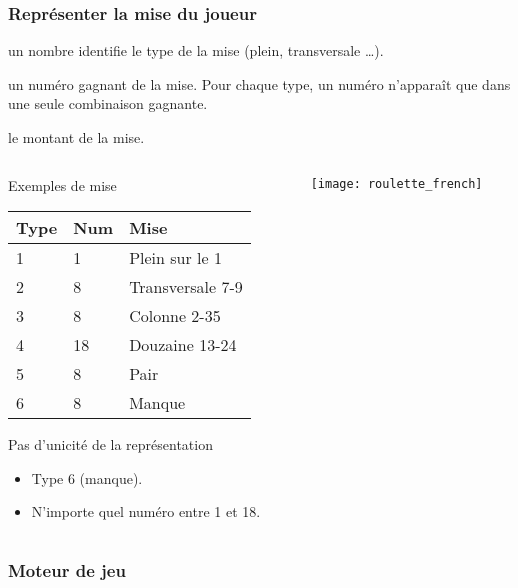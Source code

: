 \documentclass[10pt]{beamer}
\begin{document}
\begin{frame}
  \frametitle{Représenter la mise du joueur}
  \begin{description}[Montant]
  \item[Type] un nombre identifie le type de la mise (plein, transversale \dots).
  \item[Numéro] un numéro gagnant de la mise. Pour chaque type, un numéro n'apparaît que dans une seule combinaison gagnante.
  \item[Montant] le montant de la mise.
  \end{description}
  
\begin{columns}[c]
\begin{column}{0.58\textwidth}
  \begin{exampleblock}{Exemples de mise}
  \end{exampleblock}
  \begin{tabular}{lll}
    \toprule
    Type & Num & Mise             \\
    \midrule
    1    & 1   & Plein sur le 1   \\
    2    & 8   & Transversale 7-9 \\
    3    & 8   & Colonne 2-35     \\
    4    & 18  & Douzaine 13-24   \\
    5    & 8   & Pair             \\
    6    & 8   & Manque           \\
    \bottomrule
  \end{tabular}
  \begin{alertblock}{Pas d'unicité de la représentation}
    \begin{itemize}
    \item Type 6 (manque).
    \item N'importe quel numéro entre 1 et 18.
    \end{itemize}
  \end{alertblock}
  \end{column}
\begin{column}{0.42\textwidth}
    \texttt{[image: roulette\_french]}
  \end{column}
\end{columns}

\end{frame}


\begin{frame}[fragile]
  \frametitle{Moteur de jeu}
  
\end{frame}
\end{document}
